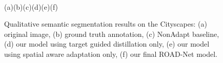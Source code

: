 \documentclass[10pt,twocolumn,letterpaper]{article}
\begin{document}
\begin{figure}[h]
      \\


      \vspace{2mm}
      (a)\hspace{0.15\linewidth}(b)\hspace{0.15\linewidth}(c)\hspace{0.15\linewidth}(d)\hspace{0.15\linewidth}(e)\hspace{0.15\linewidth}(f)
      \vspace{2mm}
        \caption{Qualitative semantic segmentation results on the Cityscapes: (a) original image, (b) ground truth annotation, (c) NonAdapt baseline, (d) our model using target guided distillation only, (e) our model using spatial aware adaptation only, (f) our final ROAD-Net model.}
        \vspace{-2mm}
\label{fig:qualitative}
\end{figure}
\end{document}
